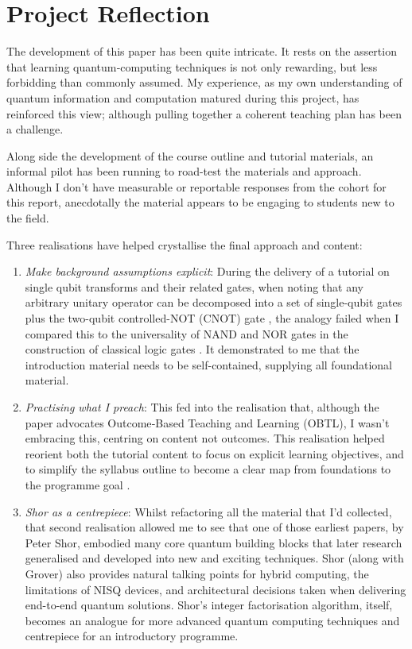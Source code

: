 \section{Project Reflection}

The development of this paper has been quite intricate.  
It rests on the assertion that learning quantum‑computing techniques 
is not only rewarding, but less forbidding than commonly assumed.
My experience, as my own understanding of quantum information and computation matured during this project, 
has reinforced this view; although pulling together a coherent teaching plan has been a challenge.

Along side the development of the course outline and tutorial materials, 
an informal pilot has been running to road-test the materials and approach. 
Although I don't have measurable or reportable responses from the cohort for this report, 
anecdotally the material appears to be engaging to students new to the field.

Three realisations have helped crystallise the final approach and content:
\begin{enumerate}
\item \emph{Make background assumptions explicit}: 
During the delivery of a tutorial on single qubit transforms and their related gates,
when noting that any arbitrary unitary operator can be decomposed 
into a set of single-qubit gates plus the two-qubit controlled-NOT (CNOT) gate \cite{Nielsen:2010},
the analogy failed when I compared this to the universality of NAND and NOR gates 
in the construction of classical logic gates \cite{Wikipedia:UniversalLogicGates}.
It demonstrated to me that the introduction material needs to be self-contained,
supplying all foundational material.

\item \emph{Practising what I preach}: This fed into the realisation that, 
although the paper advocates Outcome‑Based Teaching and Learning (OBTL), 
I wasn't embracing this, centring on content not outcomes.  
This realisation helped reorient both the tutorial content to focus on explicit learning objectives,
and to simplify the syllabus outline to become a clear map from foundations to the programme goal \cite{Wong:2011}.

\item \emph{Shor as a centrepiece}: Whilst refactoring all the material that I'd collected, 
that second realisation allowed me to see that one of those earliest papers, by Peter Shor, 
embodied many core quantum building blocks that later research generalised and developed into new and exciting techniques. 
Shor (along with Grover) also provides natural talking points for hybrid computing, the limitations of NISQ devices, 
and architectural decisions taken when delivering end-to-end quantum solutions.  
Shor's integer factorisation algorithm, itself, becomes an analogue for more advanced quantum computing techniques
and centrepiece for an introductory programme.
\end{enumerate}